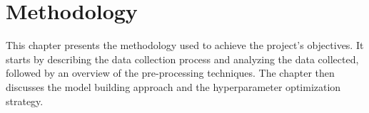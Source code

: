 \chapter{Methodology}
This chapter presents the methodology used to achieve the project's objectives.
It starts by describing the data collection process and analyzing the data collected,
followed by an overview of the pre-processing techniques.
The chapter then discusses the model building approach and the hyperparameter optimization strategy.





